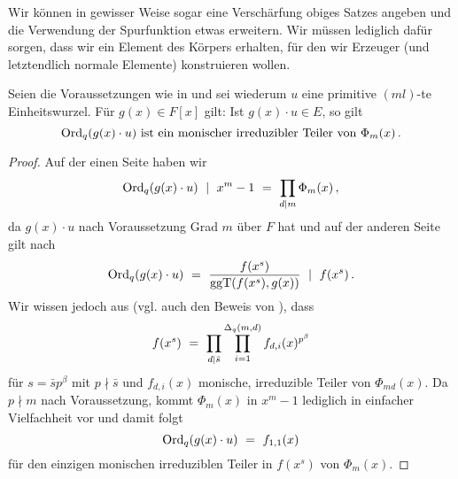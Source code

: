 Wir können in gewisser Weise sogar eine Verschärfung obiges Satzes angeben und
die Verwendung der Spurfunktion etwas erweitern. Wir müssen lediglich dafür
sorgen, dass wir ein Element des Körpers erhalten, für den wir Erzeuger (und
letztendlich normale Elemente) konstruieren wollen.

\begin{satz}
  \label{satz:q_ordnung_von_zusammensetzen}
  Seien die Voraussetzungen wie in  und 
  sei wiederum $u$ eine primitive $(ml)$-te Einheitswurzel. 
  Für $g(x) \in F[x]$ gilt:
  Ist $g(x)\cdot u \in E$, so gilt
  \[ \operatorname{Ord}_q(g(x)\cdot u) \text{ ist ein monischer irreduzibler Teiler von }
    \Phi_m(x)\,. \]
\end{satz}
\begin{proof}
  Auf der einen Seite haben wir 
  \[ \operatorname{Ord}_q(g(x)\cdot u) \ \mid\  x^m-1 \ =\  \prod_{d\mid m} \Phi_m(x)\,, \]
  da $g(x) \cdot u$ nach Voraussetzung Grad $m$ über $F$ hat und auf der
  anderen Seite gilt nach 
  \[ \operatorname{Ord}_q(g(x)\cdot u) \ =\  \frac{f(x^s)}{\operatorname{ggT}(f(x^s), g(x))} 
    \ \mid\  f(x^s) \,.\]
  Wir wissen jedoch aus  (vgl. auch den Beweis von
  ), dass 
  \[ f(x^s) \ =\  \prod_{d\mid \bar s} 
    \prod_{i=1}^{\Delta_q(m,d)} f_{d,i}(x)^{p^\beta}\]
  für $s = \bar sp^\beta$ mit $p\nmid \bar s$ und
  $f_{d,i}(x)$ monische, irreduzible Teiler von $\Phi_{md}(x)$. Da 
  $p\nmid m$ nach Voraussetzung, kommt $\Phi_m(x)$ in $x^m-1$ lediglich in
  einfacher Vielfachheit vor und damit folgt
  \[ \operatorname{Ord}_q(g(x)\cdot u) \ =\  f_{1,1}(x)\]
  für den einzigen monischen irreduziblen Teiler in $f(x^s)$ von $\Phi_m(x)$.
\end{proof}


